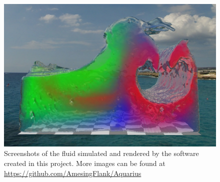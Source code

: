 \documentclass[12pt]{ociamthesis}  %
\begin{document}
\begin{figure}[p]
        \begin{minipage}[t]{.99\linewidth}
                \vspace{0pt}
                \centering
                \includegraphics[width=14cm]{FrontMultiphase_cropped}
        \end{minipage}
                
        \caption{Screenshots of the fluid simulated and rendered by the software created in this project. More images can be found at \url{https://github.com/AmesingFlank/Aquarius}}
        \label{figure front demo figures}
\end{figure}


\begin{romanpages}          %
\tableofcontents            %
\end{romanpages}            %





%




%






%
%


\end{document}
